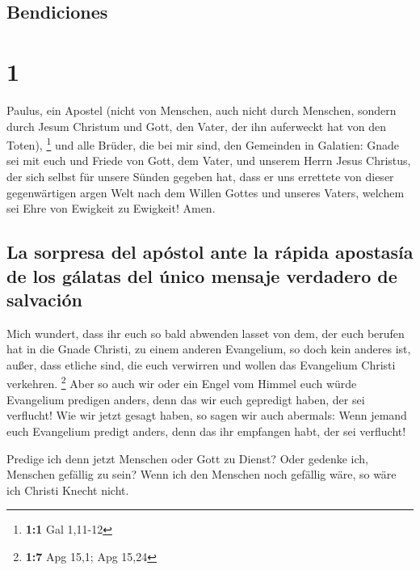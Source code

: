 \hypertarget{bendiciones}{%
\subsection{Bendiciones}\label{bendiciones}}

\hypertarget{section}{%
\section{1}\label{section}}

 Paulus, ein Apostel (nicht von Menschen, auch nicht durch
Menschen, sondern durch Jesum Christum und Gott, den Vater, der ihn
auferweckt hat von den Toten), \footnote{\textbf{1:1} Gal 1,11-12}
 und alle Brüder, die bei mir sind, den Gemeinden in
Galatien:  Gnade sei mit euch und Friede von Gott, dem
Vater, und unserem Herrn Jesus Christus,  der sich selbst
für unsere Sünden gegeben hat, dass er uns errettete von dieser
gegenwärtigen argen Welt nach dem Willen Gottes und unseres Vaters,
 welchem sei Ehre von Ewigkeit zu Ewigkeit! Amen.

\hypertarget{la-sorpresa-del-apuxf3stol-ante-la-ruxe1pida-apostasuxeda-de-los-guxe1latas-del-uxfanico-mensaje-verdadero-de-salvaciuxf3n}{%
\subsection{La sorpresa del apóstol ante la rápida apostasía de los
gálatas del único mensaje verdadero de
salvación}\label{la-sorpresa-del-apuxf3stol-ante-la-ruxe1pida-apostasuxeda-de-los-guxe1latas-del-uxfanico-mensaje-verdadero-de-salvaciuxf3n}}

 Mich wundert, dass ihr euch so bald abwenden lasset von
dem, der euch berufen hat in die Gnade Christi, zu einem anderen
Evangelium,  so doch kein anderes ist, außer, dass etliche
sind, die euch verwirren und wollen das Evangelium Christi verkehren.
\footnote{\textbf{1:7} Apg 15,1; Apg 15,24}  Aber so auch
wir oder ein Engel vom Himmel euch würde Evangelium predigen anders,
denn das wir euch gepredigt haben, der sei verflucht!  Wie
wir jetzt gesagt haben, so sagen wir auch abermals: Wenn jemand euch
Evangelium predigt anders, denn das ihr empfangen habt, der sei
verflucht!

 Predige ich denn jetzt Menschen oder Gott zu Dienst?
Oder gedenke ich, Menschen gefällig zu sein? Wenn ich den Menschen noch
gefällig wäre, so wäre ich Christi Knecht nicht.


